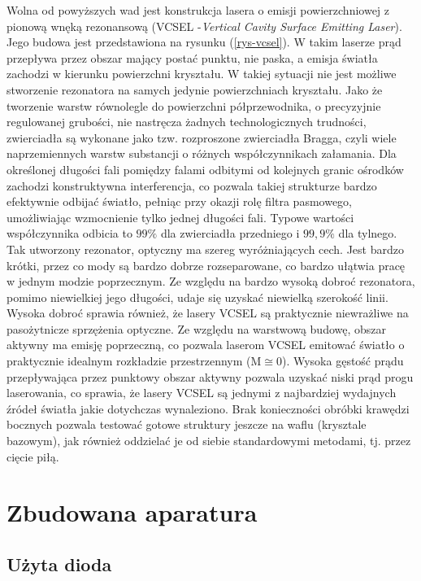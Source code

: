 \documentclass[a4paper,10pt]{article}
\begin{document}
Wolna od powyższych wad jest konstrukcja lasera o emisji powierzchniowej z pionową wnęką rezonansową (VCSEL -\textit{Vertical Cavity Surface Emitting Laser}). Jego budowa jest przedstawiona na rysunku (\ref{rys-vcsel}). W takim laserze prąd przepływa przez obszar mający postać punktu, nie paska, a emisja światła zachodzi w kierunku powierzchni kryształu. W takiej sytuacji nie jest możliwe stworzenie rezonatora na samych jedynie powierzchniach kryształu. Jako że tworzenie warstw równolegle do powierzchni półprzewodnika, o precyzyjnie regulowanej grubości, nie nastręcza żadnych technologicznych trudności, zwierciadła są wykonane jako tzw. rozproszone zwierciadła Bragga, czyli wiele naprzemiennych warstw substancji o różnych współczynnikach załamania. Dla określonej długości fali pomiędzy falami odbitymi od kolejnych granic ośrodków zachodzi konstruktywna interferencja, co pozwala takiej strukturze bardzo efektywnie odbijać światło, pełniąc przy okazji rolę filtra pasmowego, umożliwiając wzmocnienie tylko jednej długości fali. Typowe wartości współczynnika odbicia to $99\%$ dla zwierciadła przedniego i $99{,}9\%$ dla tylnego. Tak utworzony rezonator, optyczny ma szereg wyróżniających cech. Jest bardzo krótki, przez co mody są bardzo dobrze rozseparowane, co bardzo ułątwia pracę w jednym modzie poprzecznym. Ze względu na bardzo wysoką dobroć rezonatora, pomimo niewielkiej jego długości, udaje się uzyskać niewielką szerokość linii. Wysoka dobroć sprawia również, że lasery VCSEL są praktycznie niewrażliwe na pasożytnicze sprzężenia optyczne.
Ze względu na warstwową budowę, obszar aktywny ma emisję poprzeczną, co pozwala laserom VCSEL emitować światło o praktycznie idealnym rozkładzie przestrzennym (M$\cong 0$). Wysoka gęstość prądu przepływająca przez punktowy obszar aktywny pozwala uzyskać niski prąd progu laserowania, co sprawia, że lasery VCSEL są jednymi z najbardziej wydajnych źródeł światła jakie dotychczas wynaleziono. Brak konieczności obróbki krawędzi bocznych pozwala testować gotowe struktury jeszcze na waflu (krysztale bazowym), jak również oddzielać je od siebie standardowymi metodami, tj. przez cięcie piłą. 





\section{Zbudowana aparatura}

\subsection{Użyta dioda}
\end{document}
